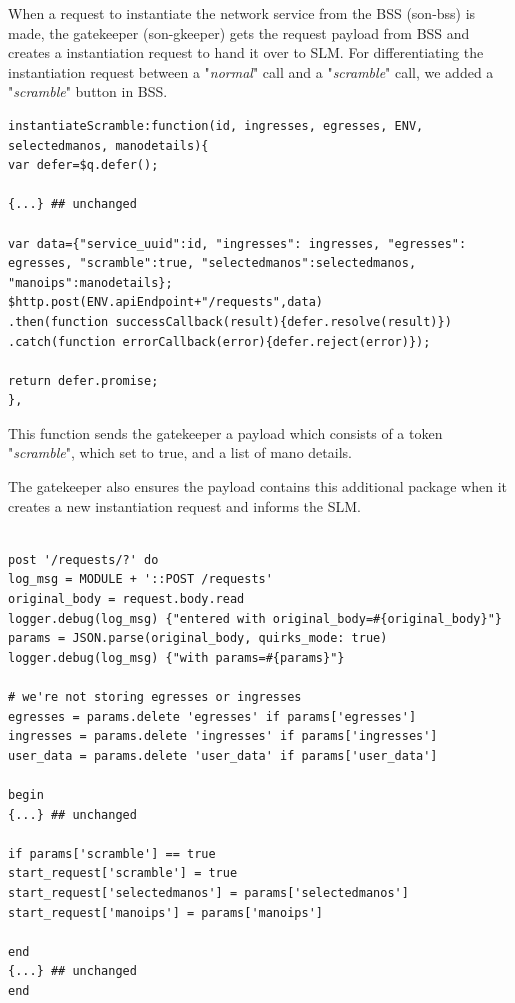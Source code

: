 When a request to instantiate the network service from the BSS (son-bss) is made, the gatekeeper (son-gkeeper) gets the request payload from BSS and creates a instantiation request to hand it over to SLM. For differentiating the instantiation request between a "\textit{normal}" call and a "\textit{scramble}" call, we added a "\textit{scramble}" button in BSS. 

\begin{lstlisting}[caption=BSS instantiateScramble function, label=lis:BSSscramble]
instantiateScramble:function(id, ingresses, egresses, ENV, selectedmanos, manodetails){				
var defer=$q.defer();

{...} ## unchanged

var data={"service_uuid":id, "ingresses": ingresses, "egresses": egresses, "scramble":true, "selectedmanos":selectedmanos, "manoips":manodetails};
$http.post(ENV.apiEndpoint+"/requests",data)
.then(function successCallback(result){defer.resolve(result)})
.catch(function errorCallback(error){defer.reject(error)});

return defer.promise;
},

\end{lstlisting}

This function sends the gatekeeper a payload which consists of a token "\textit{scramble}", which set to true, and a list of mano details.

The gatekeeper also ensures the payload contains this additional package when it creates a new instantiation request and informs the SLM. 

\begin{lstlisting}[caption=create instantiation request in gatekeeper(request.rb), label=lis:request.rb]

post '/requests/?' do
log_msg = MODULE + '::POST /requests'
original_body = request.body.read
logger.debug(log_msg) {"entered with original_body=#{original_body}"}
params = JSON.parse(original_body, quirks_mode: true)
logger.debug(log_msg) {"with params=#{params}"}

# we're not storing egresses or ingresses
egresses = params.delete 'egresses' if params['egresses']
ingresses = params.delete 'ingresses' if params['ingresses']
user_data = params.delete 'user_data' if params['user_data']

begin
{...} ## unchanged

if params['scramble'] == true
start_request['scramble'] = true 
start_request['selectedmanos'] = params['selectedmanos']
start_request['manoips'] = params['manoips']

end
{...} ## unchanged
end

\end{lstlisting}

